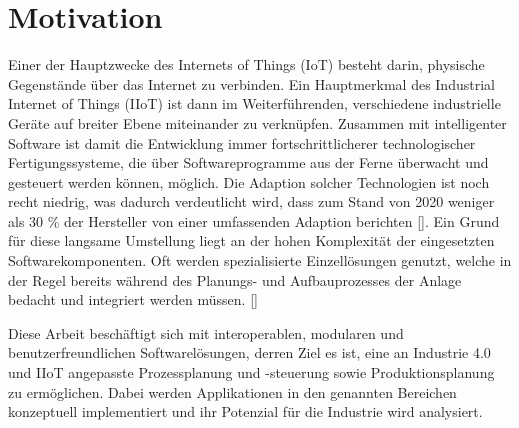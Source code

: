 \section{Motivation}
\label{sec:motivation}

Einer der Hauptzwecke des Internets of Things (IoT) besteht darin, physische Gegenstände über das Internet zu verbinden. Ein Hauptmerkmal des Industrial Internet of Things (IIoT) ist dann im Weiterführenden, verschiedene industrielle Geräte auf breiter Ebene miteinander zu verknüpfen. Zusammen mit intelligenter Software ist damit die Entwicklung immer fortschrittlicherer technologischer Fertigungssysteme, die über Softwareprogramme aus der Ferne überwacht und gesteuert werden können, möglich. Die Adaption solcher Technologien ist noch recht niedrig, was dadurch verdeutlicht wird, dass zum Stand von 2020 weniger als 30 \% der Hersteller von einer umfassenden Adaption berichten [\cite{industrie40adaption}]. Ein Grund für diese langsame Umstellung liegt an der hohen Komplexität der eingesetzten Softwarekomponenten. Oft werden spezialisierte Einzellösungen genutzt, welche in der Regel bereits während des Planungs- und Aufbauprozesses der Anlage bedacht und integriert werden müssen. [\cite{industrie40slowAdoption}]

Diese Arbeit beschäftigt sich mit interoperablen, modularen und benutzerfreundlichen Softwarelösungen, derren Ziel es ist, eine an Industrie 4.0 und IIoT angepasste Prozessplanung und -steuerung sowie Produktionsplanung zu ermöglichen. Dabei werden Applikationen in den genannten Bereichen konzeptuell implementiert und ihr Potenzial für die Industrie wird analysiert.
